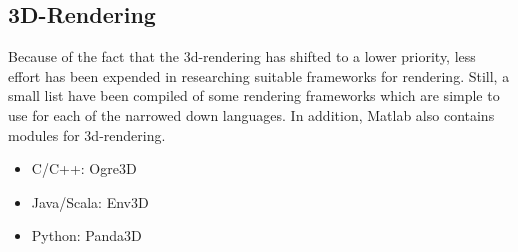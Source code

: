 \subsection{3D-Rendering}\label{sec:rendering}
Because of the fact that the 3d-rendering has shifted to a lower priority, less effort has been expended in researching suitable frameworks for rendering. Still, a small list have been compiled of some rendering frameworks which are simple to use for each of the narrowed down languages. In addition, Matlab also contains modules for 3d-rendering.
\begin{itemize}
	\item C/C++: Ogre3D \cite{web:ogre3d}
	\item Java/Scala: Env3D \cite{web:env3d}
	\item Python: Panda3D \cite{web:panda3d}
\end{itemize}
	
